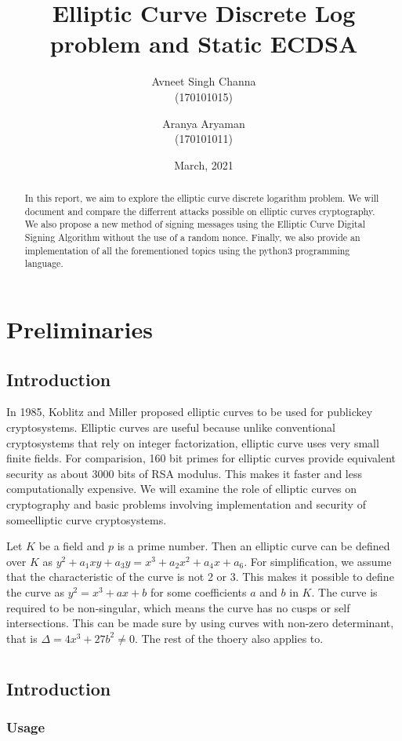 \documentclass[]{report}
\begin{document}
\title{Elliptic Curve Discrete Log problem and Static ECDSA}
\author{Avneet Singh Channa \\ (170101015)\and Aranya Aryaman \\ (170101011)}
\date{March, 2021}
\maketitle

\begin{abstract}
	In this report, we aim to explore the elliptic curve discrete logarithm problem. We will document and compare the differrent attacks possible on elliptic curves cryptography. We also propose a new method of signing messages using the Elliptic Curve Digital Signing Algorithm without the use of a random nonce.
Finally, we also provide an implementation of all the forementioned topics using the python3 programming language.
\end{abstract}

\chapter{Preliminaries}
\section{Introduction}
In 1985, Koblitz and Miller proposed elliptic curves to be used for publickey cryptosystems. Elliptic curves are useful because unlike conventional cryptosystems that rely on integer factorization, elliptic curve uses very small finite fields. For comparision, 160 bit primes for elliptic curves provide equivalent security as about 3000 bits of RSA modulus. This makes it faster and less computationally expensive. We will examine the role of elliptic curves on cryptography and basic 
problems involving implementation and security of someelliptic curve cryptosystems.

Let $K$ be a field and $p$ is a prime number. Then an elliptic curve can be defined over $K$ as $y^2+a_1xy+a_3y=x^3+a_2x^2+a_4x+a_6$. For simplification, we assume that the characteristic of the curve is not 2 or 3. This makes it possible to define the curve as $y^2 = x^3+ax+b$ for some coefficients $a$ and $b$ in $K$. The curve is required to be non-singular, which means the curve has no cusps or self intersections. This can be made sure by using curves with non-zero determinant, that is $\Delta=4x^3+27b^2\neq0$. The rest of the thoery also applies to.

\chapter{}
\section{Introduction}
\subsection{Usage}
\end{document}
